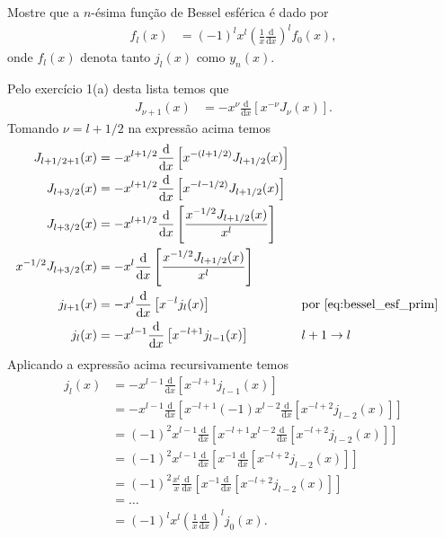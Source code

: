 \documentclass[a4paper,12pt, leqno, answers]{exam}
\begin{document}
\begin{questions}
    \question Mostre que a $n$-\'{e}sima fun\c{c}\~{a}o de Bessel esf\'{e}rica \'{e} dado por
    \begin{align*}
        f_l(x) &= (-1)^l x^l \left( \frac{1}{x} \frac{\mathrm{d}}{\mathrm{d}x} \right)^l f_0(x),
    \end{align*}
    onde $f_l(x)$ denota tanto $j_l(x)$ como $y_n(x)$.
    \begin{solution}
        Pelo exerc\'{i}cio 1(a) desta lista temos que
        \begin{align*}
            J_{\nu + 1}(x) &= -x^\nu \frac{\mathrm{d}}{\mathrm{d}x} \left[ x^{-\nu} J_\nu(x) \right].
        \end{align*}
        Tomando $\nu = l + 1/2$ na express\~{a}o acima temos
        \begin{align*}
            J_{l + 1/2 + 1}(x) &= -x^{l + 1/2} \frac{\mathrm{d}}{\mathrm{d}x} \left[ x^{-(l + 1/2)} J_{l + 1/2}(x) \right] \\
            J_{l + 3/2}(x) &= -x^{l + 1/2} \frac{\mathrm{d}}{\mathrm{d}x} \left[ x^{-l - 1/2)} J_{l + 1/2}(x) \right] \\
            J_{l + 3/2}(x) &= - x^{l + 1/2} \frac{\mathrm{d}}{\mathrm{d}x} \left[ \frac{x^{-1/2} J_{l + 1/2}(x)}{x^l} \right] \\
            x^{-1/2} J_{l + 3/2}(x) &= - x^l \frac{\mathrm{d}}{\mathrm{d}x} \left[ \frac{x^{-1/2} J_{l + 1/2}(x)}{x^l} \right] \\
            j_{l + 1}(x) &= - x^l \frac{\mathrm{d}}{\mathrm{d}x} \left[ x^{-l} j_{l}(x) \right] && \text{por \eqref{eq:bessel_esf_prim}} \\
            j_{l}(x) &= - x^{l - 1} \frac{\mathrm{d}}{\mathrm{d}x} \left[ x^{-l + 1} j_{l - 1}(x) \right] && l + 1 \to l 
        \end{align*}
        Aplicando a express\~{a}o acima recursivamente temos
        \begin{align*}
            j_{l}(x) &= - x^{l - 1} \frac{\mathrm{d}}{\mathrm{d}x} \left[ x^{-l + 1} j_{l - 1}(x) \right] \\
            &= - x^{l - 1} \frac{\mathrm{d}}{\mathrm{d}x} \left[ x^{-l + 1} (-1) x^{l - 2} \frac{\mathrm{d}}{\mathrm{d}x} \left[ x^{-l + 2} j_{l - 2}(x) \right] \right] \\
            &= (-1)^2 x^{l - 1} \frac{\mathrm{d}}{\mathrm{d}x} \left[ x^{-l + 1} x^{l - 2} \frac{\mathrm{d}}{\mathrm{d}x} \left[ x^{-l + 2} j_{l - 2}(x) \right] \right] \\
            &= (-1)^2 x^{l - 1} \frac{\mathrm{d}}{\mathrm{d}x} \left[ x^{-1} \frac{\mathrm{d}}{\mathrm{d}x} \left[ x^{-l + 2} j_{l - 2}(x) \right] \right] \\
            &= (-1)^2 \frac{x^l}{x} \frac{\mathrm{d}}{\mathrm{d}x} \left[ x^{-1} \frac{\mathrm{d}}{\mathrm{d}x} \left[ x^{-l + 2} j_{l - 2}(x) \right] \right] \\
            &= \ldots \\
            &= (-1)^l x^l \left( \frac{1}{x} \frac{\mathrm{d}}{\mathrm{d}x} \right)^l j_0(x).
        \end{align*}


\end{solution}
\end{questions}
\end{document}
